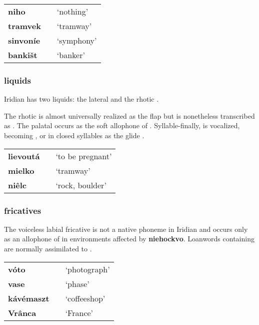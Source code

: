 \begin{center}
	\centering \small
	\begin{tabularx}{0.8\textwidth}{>{\bfseries}YYY}
		niho		&  & `nothing'\\
		tramvek		&&`tramway'\\
		sinvoníe		&&`symphony'\\
		banki\v{s}t	&  & `banker'\\
	\end{tabularx}
\end{center}
\subsubsection{liquids}
\par Iridian has two liquids: the lateral  and the rhotic .
\par The rhotic  is almost universally realized as the flap  but is nonetheless transcribed as . The palatal  occurs as the soft allophone of . Syllable-finally,  is vocalized, becoming \pn{\textltilde}, or in closed syllables as the glide .

\begin{center}
	\centering \small
	\begin{tabularx}{0.8\textwidth}{>{\bfseries}YYY}
		lievoutá		&  & `to be pregnant'\\
		mielko		&&`tramway'\\
		niêlc & \textipa{[\nn\~E\~w\ttb{ts}]}&`rock, boulder'\\
	\end{tabularx}
\end{center}

\subsubsection{fricatives}
The voiceless labial fricative  is not a native phoneme in Iridian and occurs only as an allophone of  in environments affected by \textbf{niehockvo}. Loanwords containing  are normally assimilated to .

\begin{center}\small
	\begin{tabularx}{0.8\textwidth}{>{\bfseries}YYY}
		vóto		& 		&`photograph'\\
 		vase		& 			&`phase'\\
 		kávémaszt	& 	&`coffeeshop'\\
 		Vrânca		&  & `France'\\
	\end{tabularx}
\end{center}


